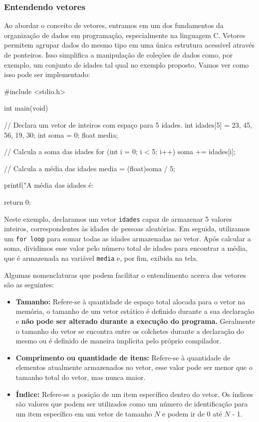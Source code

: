 \subsubsection{Entendendo vetores}

Ao abordar o conceito de vetores, entramos em um dos fundamentos da organização 
de dados em programação, especialmente na linguagem C. Vetores permitem agrupar 
dados do mesmo tipo em uma única estrutura acessível através de ponteiros. Isso 
simplifica a manipulação de coleções de dados como, por exemplo, um conjunto de 
idades tal qual no exemplo proposto. Vamos ver como isso pode ser implementado:

\newpage
\begin{excode}
    #include <stdio.h>
    
    int main(void)
    {
        // Declara um vetor de inteiros com espaço para 5 idades.
        int idades[5] = {23, 45, 56, 19, 30};
        int soma = 0;
        float media;

        // Calcula a soma das idades
        for (int i = 0; i < 5; i++) {
            soma += idades[i];
        }

        // Calcula a média das idades
        media = (float)soma / 5;

        printf("A média das idades é: %

        return 0;
    }
\end{excode}

Neste exemplo, declaramos um vetor \texttt{idades} capaz de armazenar 5 valores 
inteiros, correspondentes às idades de pessoas aleatórias. Em seguida, 
utilizamos um \texttt{for loop} para somar todas as idades armazenadas no vetor. 
Após calcular a soma, dividimos esse valor pelo número total de idades para 
encontrar a média, que é armazenada na variável \texttt{media} e, por fim, 
exibida na tela.

Algumas nomenclaturas que podem facilitar o entendimento acerca dos vetores 
são as seguintes:

\begin{itemize}
        \renewcommand{\labelitemi}{\tiny$\blacksquare$}
    \item \textbf{Tamanho:} Refere-se à quantidade de espaço total alocada para o vetor 
        na memória, o tamanho de um vetor estático é definido durante a sua 
        declaração e \textbf{não pode ser alterado durante a execução do programa.}
        Geralmente o tamanho do vetor se encontra entre os colchetes durante a 
        declaração do mesmo ou é definido de maneira implícita pelo próprio compilador.
    \item \textbf{Comprimento ou quantidade de itens:} Refere-se à quantidade de elementos 
        atualmente armazenados no vetor, esse valor pode ser menor que o tamanho 
        total do vetor, mas nunca maior.
    \item \textbf{Índice:} Refere-se a posição de um item específico dentro do 
        vetor. Os índices são valores que podem ser utilizados como um número 
        de identificação para um item específico em um vetor de tamanho \(N\) 
        e podem ir de 0 até \(N\) - 1.
\end{itemize}

